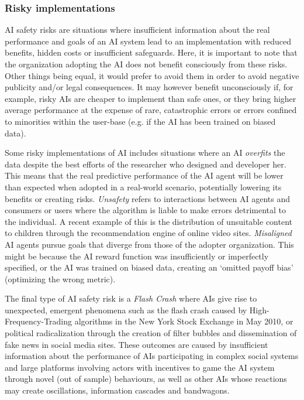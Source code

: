 \documentclass[11pt]{article}
\begin{document}
\subsubsection*{Risky implementations}
AI safety risks are situations where insufficient information about the real performance and goals of an AI system lead to an implementation with reduced benefits, hidden costs or insufficient safeguards. Here, it is important to note that the organization adopting the AI does not benefit consciously from these risks. Other things being equal, it would prefer to avoid them in order to avoid negative publicity and/or legal consequences. It may however benefit unconsciously if, for example, risky AIs are cheaper to implement than safe ones, or they bring higher average performance at the expense of rare, catastrophic errors or errors confined to minorities within the user-base (e.g. if the AI has been trained on biased data). 

Some risky implementations of AI includes situations where an AI \textit{overfits} the data despite the best efforts of the researcher who designed and developer her. This means that the real predictive performance of the AI agent will be lower than expected when adopted in a real-world scenario, potentially lowering its benefits or creating risks. \textit{Unsafety} refers to interactions between AI agents and consumers or users where the algorithm is liable to make errors detrimental to the individual. A recent example of this is the distribution of unsuitable content to children through the recommendation engine of online video sites. \textit{Misaligned} AI agents pursue goals that diverge from those of the adopter organization. This might be because the AI reward function was insufficiently or imperfectly specified, or the AI was trained on biased data, creating an `omitted payoff bias' (optimizing the wrong metric).  

The final type of AI safety risk is a \textit{Flash Crash} where AIs give rise to unexpected, emergent phenomena such as the flash crash caused by High-Frequency-Trading algorithms in the New York Stock Exchange in May 2010, or political radicalization through the creation of filter bubbles and dissemination of fake news in social media sites. These outcomes are caused by insufficient information about the performance of AIs participating in complex social systems and large platforms involving actors with incentives to game the AI system through novel (out of sample) behaviours, as well as other AIs whose reactions may create oscillations, information cascades and bandwagons.
\end{document}
